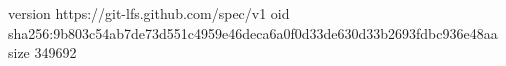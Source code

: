 version https://git-lfs.github.com/spec/v1
oid sha256:9b803c54ab7de73d551c4959e46deca6a0f0d33de630d33b2693fdbc936e48aa
size 349692
